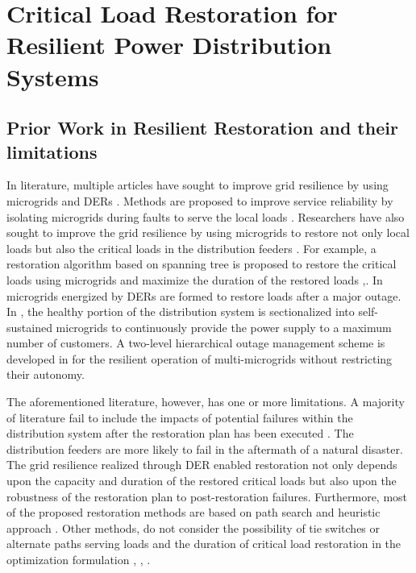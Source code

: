 \documentclass[12pt]{article}
\begin{document}
\section{Critical Load Restoration for Resilient Power Distribution Systems}
\subsection{Prior Work in Resilient Restoration and their limitations}
	In literature, multiple articles have sought to improve grid resilience by using microgrids and DERs \cite{dong2014investigation, arghandeh2016definition, gaber2016heuristics, mohagheghi2011applications, li2014distribution, gao2016resilience, chen2016resilient, wang2015self, farzin2016enhancing, 8274597}. Methods are proposed to improve service reliability by isolating microgrids during faults to serve the local loads \cite{dong2014investigation, arghandeh2016definition,gaber2016heuristics}. Researchers have also sought to improve the grid resilience by using microgrids to restore not only local loads but also the critical loads in the distribution feeders \cite{ mohagheghi2011applications, li2014distribution, gao2016resilience,chen2016resilient, wang2015self}. For example, a restoration algorithm based on spanning tree is proposed to restore the critical loads using microgrids and maximize the duration of the restored loads \cite{li2014distribution},\cite{gao2016resilience}. In \cite{chen2016resilient} microgrids energized by DERs are formed to restore loads after a major outage. In \cite{wang2015self}, the healthy portion of the distribution system is sectionalized into self-sustained microgrids to continuously provide the power supply to a maximum number of customers. A two-level hierarchical outage management scheme is developed in \cite{farzin2016enhancing} for the resilient operation of multi-microgrids without restricting their autonomy.
	
	The aforementioned literature, however, has one or more limitations. A majority of literature fail to include the impacts of potential failures within the distribution system after the restoration plan has been executed \cite{dong2014investigation, gaber2016heuristics, arghandeh2016definition, mohagheghi2011applications, li2014distribution, gao2016resilience, chen2016resilient, wang2015self, farzin2016enhancing}. The distribution feeders are more likely to fail in the aftermath of a natural disaster. The grid resilience realized through DER enabled restoration not only depends upon the capacity and duration of the restored critical loads but also upon the robustness of the restoration plan to post-restoration failures. Furthermore, most of the proposed restoration methods are based on path search and heuristic approach \cite{gaber2016heuristics, mohagheghi2011applications, li2014distribution, gao2016resilience}. Other methods, do not consider the possibility of tie switches or alternate paths serving loads and the duration of critical load restoration in the optimization formulation  \cite{chen2016resilient}, \cite{wang2015self}, \cite{8274597}.
	
\end{document}
